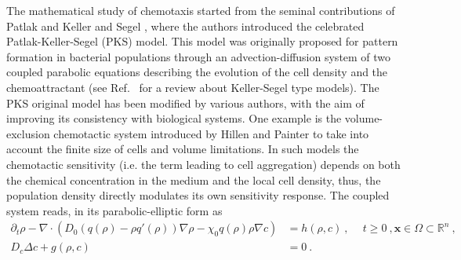 \documentclass[review,onefignum,onetabnum]{siamart220329}
\begin{document}
The mathematical study of chemotaxis started from the seminal contributions of Patlak \cite{patlak1953random} and Keller and Segel \cite{keller1970initiation,keller1971model}, where the authors introduced the celebrated Patlak-Keller-Segel (PKS) model. This model was originally proposed for pattern formation in bacterial populations through an advection-diffusion system of two coupled parabolic equations describing the evolution of the cell density and the chemoattractant (see Ref.~\cite{Hillen2009} for a review about Keller-Segel type models). %
The PKS original model has been modified by various authors, with the aim of improving its consistency with biological systems. One example is the volume-exclusion chemotactic system introduced by Hillen and Painter \cite{painter2002volume} to take into account the finite size of cells and volume limitations. In such models the chemotactic sensitivity (i.e. the term leading to cell aggregation) depends on both the chemical concentration in the medium and the local cell density, thus, the population density directly modulates its own sensitivity response. The coupled system reads, in {{its}} parabolic-elliptic form as
\begin{equation}
\begin{aligned}
    \partial_t\rho-\nabla\cdot\left(D_0(q(\rho)-\rho q'(\rho))\nabla\rho-\chi_0q(\rho)\rho\nabla c\right)&=h(\rho,c)\ , \ \quad t\geq 0\ , \mathbf{x}\in \Omega\subset\mathbb{R}^n\ ,\\
    D_c\Delta c+g(\rho,c)& = 0\ .
    \label{eq: starting model equation}
\end{aligned}
\end{equation}
\end{document}
